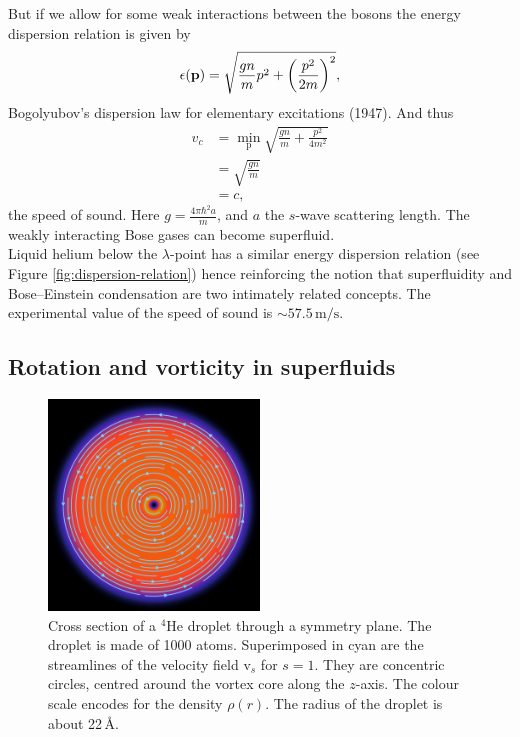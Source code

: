 \documentclass[12pt,a4paper]{book}
\renewcommand{\vec}[1]{\bm{\mathrm{#1}}}
\newcommand{\unit}[1]{\,\mathrm{#1}}
\begin{document}
			But if we allow for some weak interactions between the bosons the energy dispersion relation is given by
			\begin{align}
				\epsilon(\vec{p})=\sqrt{\frac{gn}{m}p^2+\qty(\frac{p^2}{2m})^2},
			\end{align}
			Bogolyubov's dispersion law for elementary excitations (1947). And thus
			\begin{align}
				v_c &=\min_{\vec{p}}\sqrt{\frac{gn}{m}+\frac{p^2}{4m^2}} \\
					&= \sqrt{\frac{gn}{m}} \\
					&= c,
			\end{align}
			the speed of sound. Here $g=\frac{4\pi\hbar^2a}{m}$, and $a$ the $s$-wave scattering length. The weakly interacting Bose gases can become superfluid.\\			

			Liquid helium below the $\lambda$-point has a similar energy dispersion relation (see Figure \ref{fig:dispersion-relation}) hence reinforcing the notion that superfluidity and Bose--Einstein condensation are two intimately related concepts. The experimental value of the speed of sound is $\sim\!57.5\unit{m/s}$.
			
		\subsection{Rotation and vorticity in superfluids}\label{sec:rot-vort}
		\begin{figure}[t]
			\begin{center}
				\includegraphics[width=0.5\textwidth]{vortex-xy}
			\end{center}
			\caption{Cross section of a $^4$He droplet through a symmetry plane. The droplet is made of 1000 atoms. Superimposed in cyan are the streamlines of the velocity field $\vec{v}_s$ for $s=1$. They are concentric circles, centred around the vortex core along the $z$-axis. The colour scale encodes for the density $\rho(r)$. The radius of the droplet is about 22\,\AA.}
			\label{fig:vortex-xy}
		\end{figure}
		
\end{document}
